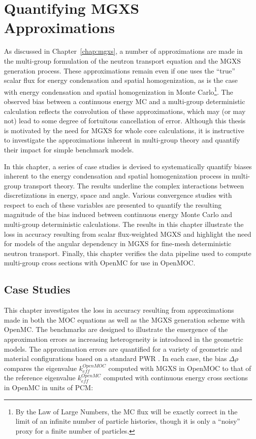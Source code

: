 \chapter{Quantifying MGXS Approximations}
\label{chap:biases}

As discussed in Chapter~\ref{chap:mgxs}, a number of approximations are made in the multi-group formulation of the neutron transport equation and the \ac{MGXS} generation process. These approximations remain even if one uses the ``true'' scalar flux for energy condensation and spatial homogenization, as is the case with energy condensation and spatial homogenization in Monte Carlo\footnote{By the Law of Large Numbers, the \ac{MC} flux will be exactly correct in the limit of an infinite number of particle histories, though it is only a ``noisy'' proxy for a finite number of particles.}. The observed bias between a continuous energy \ac{MC} and a multi-group deterministic calculation reflects the convolution of these approximations, which may (or may not) lead to some degree of fortuitous cancellation of error. Although this thesis is motivated by the need for \ac{MGXS} for whole core calculations, it is instructive to investigate the approximations inherent in multi-group theory and quantify their impact for simple benchmark models.

In this chapter, a series of case studies is devised to systematically quantify biases inherent to the energy condensation and spatial homogenization process in multi-group transport theory. The results underline the complex interactions between discretizations in energy, space and angle. Various convergence studies with respect to each of these variables are presented to quantify the resulting magnitude of the bias induced between continuous energy Monte Carlo and multi-group deterministic calculations. The results in this chapter illustrate the loss in accuracy resulting from scalar flux-weighted \ac{MGXS} and highlight the need for models of the angular dependency in \ac{MGXS} for fine-mesh deterministic neutron transport. Finally, this chapter verifies the data pipeline used to compute multi-group cross sections with OpenMC for use in OpenMOC.


\section{Case Studies}
\label{sec:chap4-case-studies}

This chapter investigates the loss in accuracy resulting from approximations made in both the \ac{MOC} equations as well as the \ac{MGXS} generation scheme with OpenMC. The benchmarks are designed to illustrate the emergence of the approximation errors as increasing heterogeneity is introduced in the geometric models. The approximation errors are quantified for a variety of geometric and material configurations based on a standard \ac{PWR} . In each case, the bias $\Delta\rho$ compares the eigenvalue $k_{eff}^{OpenMOC}$ computed with \ac{MGXS} in OpenMOC to that of the reference eigenvalue $k_{eff}^{OpenMC}$ computed with continuous energy cross sections in OpenMC in units of \ac{PCM}:

